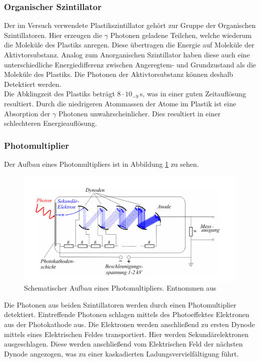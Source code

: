 \subsubsection{Organischer Szintillator}
Der im Versuch verwendete Plastikszintillator gehört zur Gruppe der Organischen Szintillatoren. Hier erzeugen die $\gamma$ Photonen geladene Teilchen, welche wiederum die Moleküle des Plastiks anregen. Diese übertragen die Energie auf Moleküle der Aktivtorsubstanz. Analog zum Anorganischen Szintillator haben diese auch eine unterschiedliche Energiedifferenz zwischen Angeregtem- und Grundzustand als die Moleküle des Plastiks.
Die Photonen der Aktivtorsubstanz können deshalb Detektiert werden.\\

Die Abklingzeit des Plastiks beträgt $8\cdot 10_{-9}\,$s, was in einer guten Zeitauflösung resultiert. Durch die niedrigeren Atommassen der Atome im Plastik ist eine Absorption der $\gamma$ Photonen unwahrscheinlicher. Dies resultiert in einer schlechteren Energieauflösung.

\subsubsection{Photomultiplier}
Der Aufbau eines Photomultipliers ist in Abbildung \ref{photomul} zu sehen. 

\begin{figure}
\centering
\includegraphics[scale=0.7]{Bilder/photomul}
\caption[Aufbau Photomultiplier]{\small Schematischer Aufbau eines Photomultipliers. Entnommen aus \cite{staatsex_szinti}}
\label{photomul}
\end{figure}

Die Photonen aus beiden Szintillatoren werden durch einen Photomultiplier detektiert. Eintreffende Photonen schlagen mittels des Photoeffektes Elektronen aus der Photokathode aus. Die Elektronen werden anschließend zu ersten Dynode mittels eines Elektrischen Feldes transportiert. Hier werden Sekundärelektronen ausgeschlagen. Diese werden anschließend vom Elektrischen Feld der nächsten Dynode angezogen, was zu einer kaskadierten Ladungsvervielfältigung führt. 

